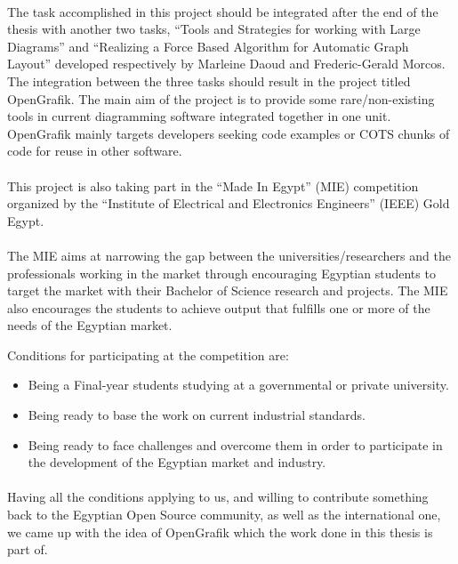 \paragraph{}
The task accomplished in this project should be integrated after the end of the thesis with another two tasks, ``Tools and Strategies for working with Large Diagrams'' and ``Realizing a Force Based Algorithm for Automatic Graph Layout'' developed respectively by Marleine Daoud and Frederic-Gerald Morcos. The integration between the three tasks should result in the project titled OpenGrafik. The main aim of the project is to provide some rare/non-existing tools in current diagramming software integrated together in one unit. OpenGrafik mainly targets developers seeking code examples or COTS chunks of code for reuse in other software.

\paragraph{}
This project is also taking part in the ``Made In Egypt'' (MIE) competition organized by the ``Institute of Electrical and Electronics Engineers'' (IEEE) Gold Egypt. \cite{mie} \cite{ieee} \cite{ieeegoldegypt}

\paragraph{}
The MIE aims at narrowing the gap between the universities/researchers and the professionals working in the market through encouraging Egyptian students to target the market with their Bachelor of Science research and projects. The MIE also encourages the students to achieve output that fulfills one or more of the needs of the Egyptian market.

Conditions for participating at the competition are:
\begin{itemize}
\item Being a Final-year students studying at a governmental or private university.
\item Being ready to base the work on current industrial standards.
\item Being ready to face challenges and overcome them in order to participate in the development of the Egyptian market and industry.
\end{itemize}

\paragraph{}
Having all the conditions applying to us, and willing to contribute something back to the Egyptian Open Source community, as well as the international one, we came up with the idea of OpenGrafik which the work done in this thesis is part of.


